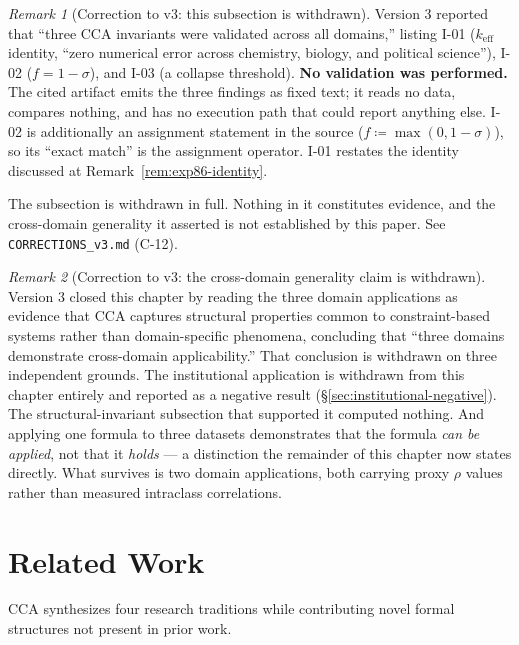 \documentclass[11pt,a4paper]{article}
\theoremstyle{definition}
\theoremstyle{remark}
\newtheorem{remark}{Remark}[section]
\newcommand{\keff}{k_{\text{eff}}}
\begin{document}
\begin{remark}[Correction to v3: this subsection is withdrawn]
Version 3 reported that ``three CCA invariants were validated across all domains,'' listing I-01 ($\keff$ identity, ``zero numerical error across chemistry, biology, and political science''), I-02 ($f = 1-\sigma$), and I-03 (a collapse threshold). \textbf{No validation was performed.} The cited artifact emits the three findings as fixed text; it reads no data, compares nothing, and has no execution path that could report anything else. I-02 is additionally an assignment statement in the source ($f \coloneqq \max(0, 1-\sigma)$), so its ``exact match'' is the assignment operator. I-01 restates the identity discussed at Remark~\ref{rem:exp86-identity}.

The subsection is withdrawn in full. Nothing in it constitutes evidence, and the cross-domain generality it asserted is not established by this paper. See \texttt{CORRECTIONS\_v3.md} (C-12).
\end{remark}

\begin{remark}[Correction to v3: the cross-domain generality claim is withdrawn]
Version 3 closed this chapter by reading the three domain applications as evidence that CCA
captures structural properties common to constraint-based systems rather than domain-specific
phenomena, concluding that ``three domains demonstrate cross-domain applicability.'' That
conclusion is withdrawn on three independent grounds. The institutional application is
withdrawn from this chapter entirely and reported as a negative result
(\S\ref{sec:institutional-negative}). The structural-invariant subsection that supported it
computed nothing. And applying one formula to three datasets demonstrates that the formula
\emph{can be applied}, not that it \emph{holds} --- a distinction the remainder of this chapter
now states directly. What survives is two domain applications, both carrying proxy $\rho$
values rather than measured intraclass correlations.
\end{remark}

\section{Related Work}
\label{sec:related}

CCA synthesizes four research traditions while contributing novel formal structures not present in prior work.
\end{document}
